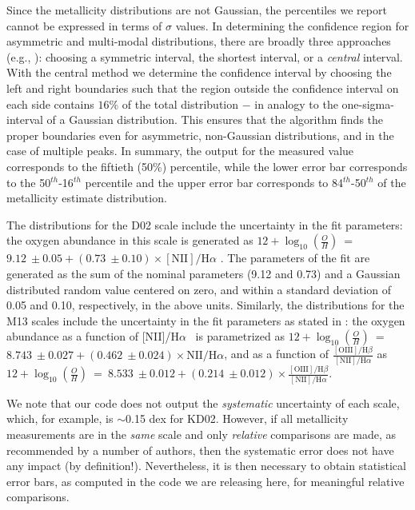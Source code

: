 \documentclass{emulateapj}
\newcommand{\oxab}{\ensuremath{12 + \log_{10}(\frac{O}{H})}}
\newcommand{\ha}{H$\alpha$}
\begin{document}
Since the metallicity distributions are not Gaussian, the percentiles we report cannot be expressed in terms of $\sigma$ values. In determining the confidence region for asymmetric and multi-modal distributions, there are broadly three approaches (e.g., \citealt{andrae10}): choosing a symmetric interval, the shortest interval, or a \emph{central} interval.  With the central method we determine the confidence interval by choosing the left and right boundaries such that the region outside the confidence interval on each side contains $16\%$ of the total distribution $-$ in analogy to the one-sigma-interval of a Gaussian distribution. This ensures that the algorithm finds the proper boundaries even for asymmetric, non-Gaussian distributions, and in the case of multiple peaks. In summary, the output for the measured value corresponds to the fiftieth (50\%) percentile, while the lower error bar corresponds to the 50$^{th}$-16$^{th}$ percentile and the upper error bar corresponds to 84$^{th}$-50$^{th}$ of the metallicity estimate distribution. 

The distributions for the D02 scale include the uncertainty in the fit parameters: the oxygen abundance in this scale is generated as \oxab~=~$9.12~\pm 0.05 + (0.73~\pm 0.10)\times\mathrm{[NII]}/\mathrm{H}\alpha$ \citep{denicolo02}. The parameters of the fit are generated as the sum of the nominal parameters (9.12 and 0.73) and a Gaussian distributed random value centered on zero, and within a standard deviation of 0.05 and 0.10, respectively, in the above units.
Similarly, the distributions for the M13 scales include the uncertainty in the fit parameters as stated in \citet{marino13}: the oxygen abundance as a function of [NII]/\ha~ is parametrized as \oxab~=~$8.743~\pm 0.027 + (0.462~\pm 0.024)\times\mathrm{NII}/\mathrm{H}\alpha$, and as a function of $\frac{\mathrm{[OIII]/H}\beta} {\mathrm{[NII]/H}\alpha}$ as \oxab~=~$8.533~\pm 0.012 + (0.214~\pm 0.012)\times\frac{\mathrm{[OIII]/H}\beta} {\mathrm{[NII]/H}\alpha}$.

We note that our code does not output the \emph{systematic} uncertainty of each scale, which, for example, is $\sim$0.15 \nolinebreak dex  for KD02. However, if all metallicity measurements are in the \emph{same} scale and only \emph{relative} comparisons are made, as recommended by a number of authors, then the systematic error does not have any impact (by definition!). Nevertheless, it is then necessary to obtain statistical error bars, as computed in the code we are releasing here, for meaningful relative comparisons.
\end{document}
